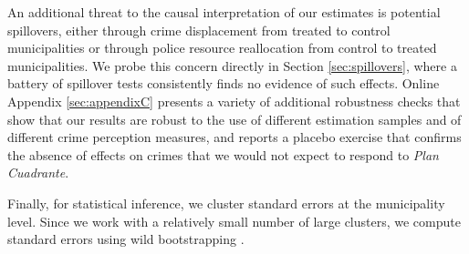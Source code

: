 An additional threat to the causal interpretation of our estimates is potential spillovers, either through crime displacement from treated to control municipalities or through police resource reallocation from control to treated municipalities. We probe this concern directly in Section \ref{sec:spillovers}, where a battery of spillover tests consistently finds no evidence of such effects. Online Appendix \ref{sec:appendixC} presents a variety of additional robustness checks that show that our results are robust to the use of different estimation samples and of different crime perception measures, and reports a placebo exercise that confirms the absence of effects on crimes that we would not expect to respond to \emph{Plan Cuadrante}.

Finally, for statistical inference, we cluster standard errors at the municipality level. Since we work with a relatively small number of large clusters, we compute standard errors using wild bootstrapping \citep{Cameron}.